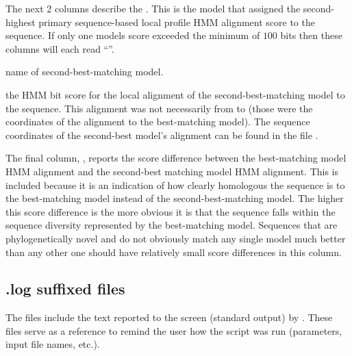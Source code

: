 The next 2 columns describe the . This is the
model that assigned the second-highest primary sequence-based local 
profile HMM alignment score to the sequence. If only one models score
exceeded the minimum of $100$ bits then these columns will each read
``\prog{-}''.

\begin{wideitem}
\item[\emprog{model name}] name of second-best-matching model.

\item[\emprog{HMM sc}] the HMM bit score for the local alignment of
  the second-best-matching model to the sequence. This alignment was
  not necessarily from  to  (those were the
  coordinates of the alignment to the best-matching model). The
  sequence coordinates of the second-best model's alignment can be
  found in the file .
\end{wideitem}

The final column, , reports the score difference between
the best-matching model HMM alignment and the second-best matching
model HMM alignment. This is included because it is an indication of
how clearly homologous the sequence is to the best-matching model
instead of the second-best-matching model. The higher this score
difference is the more obvious it is that the sequence falls within
the sequence diversity represented by the best-matching model.
Sequences that are phylogenetically novel and do not obviously match
any single model much better than any other one should have relatively
small score differences in this column.

\subsection{.log suffixed files}

The  files include the text reported to the screen
(standard output) by . These files serve as a
reference to remind the user how the  script was run
(parameters, input file names, etc.). 



